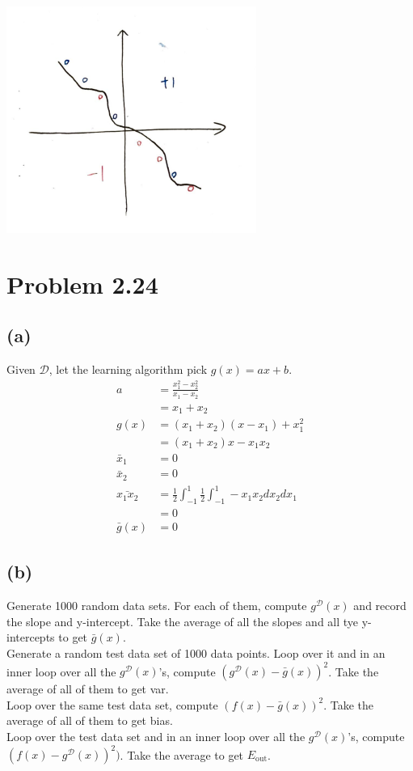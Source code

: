 \documentclass{article}
\begin{document}
		\includegraphics[scale=0.55]{p2.15b.png}
		
	\section*{Problem 2.24}
	\subsection*{(a)}
		Given $\mathcal D$, let the learning algorithm pick $g(x) = ax + b$.
		\begin{align*}
			a &= \frac{x_1^2 - x_2^2}{x_1 - x_2}\\
			&= x_1 + x_2\\
			g(x) &= (x_1 + x_2)(x - x_1) + x_1^2\\
			&= (x_1+x_2)x - x_1x_2\\
			\bar x_1 &= 0\\
			\bar x_2 &= 0\\
			\bar{x_1x_2} &= \frac12\int_{-1}^1\frac12\int_{-1}^1 -x_1x_2 dx_2dx_1\\
			&= 0\\
			\bar g(x) &= \boxed{0}
		\end{align*}
		
	\subsection*{(b)}
		Generate 1000 random data sets. For each of them, compute $g^\mathcal D(x)$ and record the slope and y-intercept. Take the average of all the slopes and all tye y-intercepts to get $\bar g(x)$.\\
		Generate a random test data set of 1000 data points. Loop over it and in an inner loop over all the $g^\mathcal D(x)$'s, compute $(g^\mathcal D(x) - \bar g(x))^2$. Take the average of all of them to get var.\\
		Loop over the same test data set, compute $(f(x) - \bar g(x))^2$. Take the average of all of them to get bias.\\
		Loop over the test data set and in an inner loop over all the $g^\mathcal D(x)$'s, compute $(f(x) - g^\mathcal D(x))^2)$. Take the average to get $E_{\text{out}}$.
		
\end{document}

